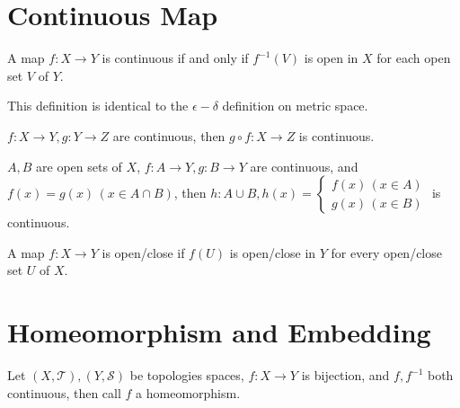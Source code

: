 \section{Continuous Map}
\begin{defi}[continuous]
A map $f : X \to Y$ is continuous if and only if $f^{-1}(V)$ is open in $X$ for
each open set $V$ of $Y$.
\end{defi}
\begin{rem}
This definition is identical to the $\epsilon-\delta$ definition on metric space.
\end{rem}
\begin{pro}
$f : X \to Y, g : Y \to Z$ are continuous, then $g \circ f : X \to Z$ is continuous.
\end{pro}
\begin{lem}
$A, B$ are open sets of $X$, $f : A \to Y, g : B \to Y$ are continuous, and $f(x) = g(x) \,(x \in A \cap B)$,
then $h : A \cup B, h(x) = \begin{cases}f(x)\,(x \in A) \\ g(x)\,(x \in B)\end{cases}$ is continuous.
\end{lem}

\begin{defi}
A map $f : X \to Y$ is open/close if $f(U)$ is open/close in $Y$ for every
open/close set $U$ of $X$.
\end{defi}

\section{Homeomorphism and Embedding}
\begin{defi}
Let $(X, \mathcal{T}), (Y, \mathcal{S})$ be topologies spaces,
$f : X \to Y$ is bijection, and $f, f^{-1}$ both continuous,
then call $f$ a homeomorphism.
\end{defi}



